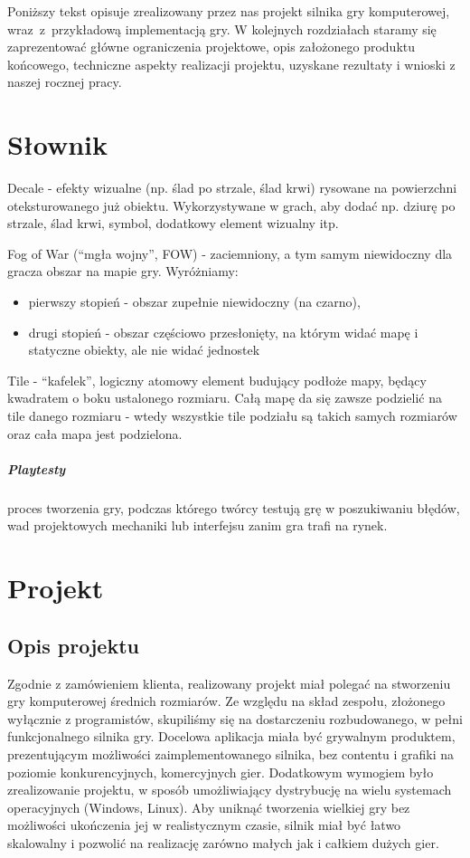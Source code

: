 \documentclass[licencjacka]{pracamgr}
\begin{document}
Poniższy tekst opisuje zrealizowany przez nas projekt silnika gry komputerowej, wraz~z~przykładową implementacją gry. W kolejnych
rozdziałach staramy się zaprezentować główne ograniczenia projektowe, opis założonego produktu końcowego,
techniczne aspekty realizacji projektu, uzyskane rezultaty i wnioski z naszej rocznej pracy.


\chapter{Słownik}
  Decale - efekty wizualne (np. ślad po strzale, ślad krwi) rysowane na powierzchni oteksturowanego już obiektu.
  Wykorzystywane w grach, aby dodać np. dziurę po strzale, ślad krwi, symbol, dodatkowy element wizualny itp.

  Fog of War (``mgła wojny'', FOW) - zaciemniony, a tym samym niewidoczny dla gracza obszar na mapie gry. Wyróżniamy:
  \begin{itemize}
   \item pierwszy stopień - obszar zupełnie niewidoczny (na czarno),
   \item drugi stopień - obszar częściowo przesłonięty, na którym widać mapę i statyczne obiekty, ale
      nie widać jednostek
  \end{itemize}

  Tile - ``kafelek'', logiczny atomowy element budujący podłoże mapy, będący kwadratem o boku ustalonego rozmiaru. Całą
  mapę da się zawsze podzielić na tile danego rozmiaru - wtedy wszystkie tile podziału są takich samych rozmiarów oraz
  cała mapa jest podzielona.

  \paragraph{Playtesty} proces tworzenia gry, podczas którego twórcy testują grę w poszukiwaniu błędów,
  wad projektowych mechaniki lub interfejsu zanim gra trafi na rynek.

\chapter{Projekt}

  \section{Opis projektu}
  Zgodnie z zamówieniem klienta, realizowany projekt miał polegać na stworzeniu gry komputerowej
  średnich rozmiarów. Ze względu na skład zespołu, złożonego wyłącznie z programistów, skupiliśmy się
  na dostarczeniu rozbudowanego, w pełni funkcjonalnego silnika gry.
  Docelowa aplikacja miała być grywalnym produktem, prezentującym możliwości zaimplementowanego silnika,
  bez contentu i grafiki na poziomie konkurencyjnych, komercyjnych gier. Dodatkowym wymogiem było zrealizowanie
  projektu, w sposób umożliwiający dystrybucję na wielu systemach operacyjnych (Windows, Linux). Aby uniknąć
  tworzenia wielkiej gry bez możliwości ukończenia jej w realistycznym czasie, silnik miał być łatwo skalowalny
  i pozwolić na realizację zarówno małych jak i całkiem dużych gier.
\end{document}
